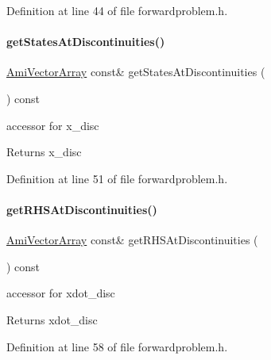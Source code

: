 Definition at line 44 of file forwardproblem.\+h.

\mbox{\label{classamici_1_1_forward_problem_ae983e618f5d4161e92b3a86f4abd1048}} 
\paragraph{\texorpdfstring{get\+States\+At\+Discontinuities()}{getStatesAtDiscontinuities()}}
{\footnotesize\ttfamily \mbox{\hyperlink{classamici_1_1_ami_vector_array}{Ami\+Vector\+Array}} const\& get\+States\+At\+Discontinuities (\begin{DoxyParamCaption}{ }\end{DoxyParamCaption}) const}

accessor for x\+\_\+disc \begin{DoxyReturn}{Returns}
x\+\_\+disc 
\end{DoxyReturn}


Definition at line 51 of file forwardproblem.\+h.

\mbox{\label{classamici_1_1_forward_problem_aaf71ce300e66a3034148c77417294897}} 
\paragraph{\texorpdfstring{get\+R\+H\+S\+At\+Discontinuities()}{getRHSAtDiscontinuities()}}
{\footnotesize\ttfamily \mbox{\hyperlink{classamici_1_1_ami_vector_array}{Ami\+Vector\+Array}} const\& get\+R\+H\+S\+At\+Discontinuities (\begin{DoxyParamCaption}{ }\end{DoxyParamCaption}) const}

accessor for xdot\+\_\+disc \begin{DoxyReturn}{Returns}
xdot\+\_\+disc 
\end{DoxyReturn}


Definition at line 58 of file forwardproblem.\+h.

